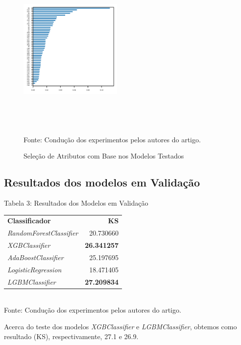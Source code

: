 \begin{figure}[h]
\centering
\caption{\label{figure:figura2}Seleção de Atributos com Base nos Modelos Testados}
  \includegraphics[width=0.45\textwidth,height=90mm]{assets/feature_importances.png}
  \\ Fonte: Condução dos experimentos pelos autores do artigo.
\end{figure}


\subsection{Resultados dos modelos em Validação}

Tabela 3: Resultados dos Modelos em Validação
\begin{center}
\begin{tabular}{lr}

    \Xhline{2.5\arrayrulewidth}
    \textbf{Classificador} &         \textbf{KS} \\
    \Xhline{2.5\arrayrulewidth}

    \textit{RandomForestClassifier} &  20.730660 \\
    \hline
    \textit{XGBClassifier} &  \textbf{26.341257} \\
    \hline
    \textit{AdaBoostClassifier} &  25.197695 \\
    \hline
    \textit{LogisticRegression} &  18.471405 \\
    \hline
    \textit{LGBMClassifier} &  \textbf{27.209834} \\

\end{tabular}
\\ Fonte: Condução dos experimentos pelos autores do artigo.
\end{center}

Acerca do teste dos modelos \textit{XGBClassifier} e \textit{LGBMClassifier}, obtemos como resultado (KS), respectivamente, 27.1 e 26.9.